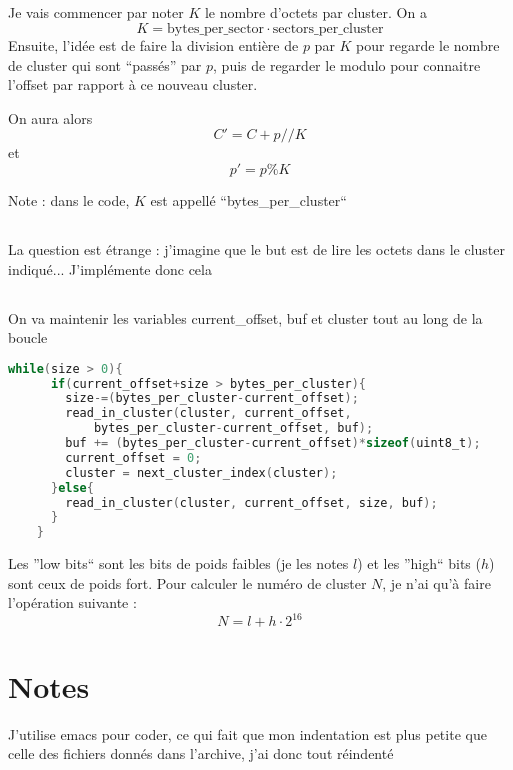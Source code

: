 \documentclass[11pt]{article} %
\begin{document}
\subsection{}
Je vais commencer par noter $K$ le nombre d'octets par cluster. On a 
$$K = \text{bytes\_per\_sector} \cdot \text{sectors\_per\_cluster}$$
Ensuite, l'idée est de faire la division entière de $p$ par $K$ pour regarde le nombre de cluster qui sont ``passés'' par $p$, puis de regarder le modulo pour connaitre l'offset par rapport à ce nouveau cluster.

On aura alors 
$$C' = C + p//K$$ et $$p' = p\%K$$

Note : dans le code, $K$ est appellé ``bytes\_per\_cluster``
\setcounter{subsection}{2}
\subsection{}
La question est étrange : j'imagine que le but est de lire les octets dans le cluster indiqué... J'implémente donc cela
\subsection{}
On va maintenir les variables current\_offset, buf et cluster tout au long de la boucle
\begin{lstlisting}[language=C]
    while(size > 0){
      if(current_offset+size > bytes_per_cluster){
        size-=(bytes_per_cluster-current_offset);
        read_in_cluster(cluster, current_offset, 
			bytes_per_cluster-current_offset, buf);
        buf += (bytes_per_cluster-current_offset)*sizeof(uint8_t); 
        current_offset = 0; 
        cluster = next_cluster_index(cluster); 
      }else{ 
        read_in_cluster(cluster, current_offset, size, buf);
      }
    }

\end{lstlisting}

\setcounter{subsection}{4}
Les ''low bits`` sont les bits de poids faibles (je les notes $l$) et les ''high`` bits ($h$) sont ceux de poids fort. Pour calculer le numéro de cluster $N$, je n'ai qu'à faire l'opération suivante :
$$
  N = l + h \cdot 2^{16}
$$

\section*{Notes}
J'utilise emacs pour coder, ce qui fait que mon indentation est plus petite que celle des fichiers donnés dans l'archive, j'ai donc tout réindenté
\end{document}
